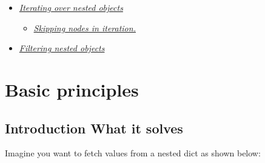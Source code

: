 \documentclass[a4paper,10pt,english]{sphinxmanual}
\begin{document}
\begin{itemize}
\begin{itemize}
\item {}
\sphinxAtStartPar
{\hyperref[\detokenize{README:add----adding-a-new-element-to-a-set}]{\emph{add() \textendash{} adding a new element to a }}}

\item {}
\sphinxAtStartPar
{\hyperref[\detokenize{README:update----update-multiple-elements-in-a-set-or-dict}]{\emph{update() \textendash{} update multiple elements in a  or }}}

\item {}
\sphinxAtStartPar
{\hyperref[\detokenize{README:remove-delete-and-pop}]{\emph{remove(), delete() and pop()}}}

\item {}
\sphinxAtStartPar
{\hyperref[\detokenize{README:serialize----ensure-that-a-tree-is-json--or-yaml-serializable}]{\emph{serialize() \textendash{} ensure that a tree is json\sphinxhyphen{} or yaml\sphinxhyphen{}serializable}}}

\item {}
\sphinxAtStartPar
{\hyperref[\detokenize{README:mod----modifying-elements}]{\emph{mod() \textendash{} modifying elements}}}

\end{itemize}

\item {}
\sphinxAtStartPar
{\hyperref[\detokenize{README:iterating-over-nested-objects}]{\emph{Iterating over nested objects}}}
\begin{itemize}
\item {}
\sphinxAtStartPar
{\hyperref[\detokenize{README:skipping-nodes-in-iteration}]{\emph{Skipping nodes in iteration.}}}

\end{itemize}

\item {}
\sphinxAtStartPar
{\hyperref[\detokenize{README:filtering-nested-objects}]{\emph{Filtering nested objects}}}

\end{itemize}




\section{Basic principles}
\label{\detokenize{README:basic-principles}}

\subsection{Introduction \textendash{} What it solves}
\label{\detokenize{README:introduction-what-it-solves}}
\sphinxAtStartPar
Imagine you want to fetch values from a nested dict as shown below:
\end{document}

